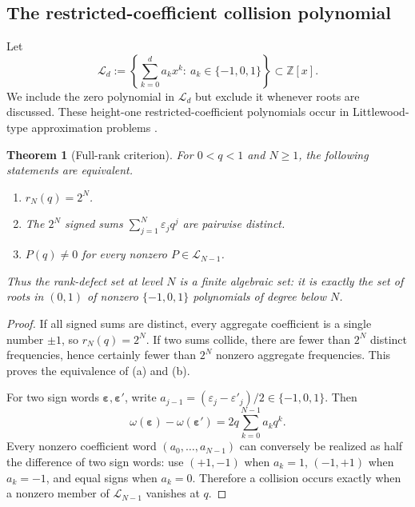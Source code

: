 \documentclass[11pt]{article}
\numberwithin{equation}{section}
\newtheorem{theorem}{Theorem}[section]
\theoremstyle{definition}
\theoremstyle{remark}
\newcommand{\Z}{\mathbb Z}
\newcommand{\eps}{\varepsilon}
\begin{document}
\subsection{The restricted-coefficient collision polynomial}

Let
\begin{equation}
 \mathscr L_d:=
 \left\{\sum_{k=0}^{d}a_kx^k:\ a_k\in\{-1,0,1\}\right\}
 \subset\Z[x].
 \label{eq:littlewood-class}
\end{equation}
We include the zero polynomial in $\mathscr L_d$ but exclude it whenever roots
are discussed.  These height-one restricted-coefficient polynomials occur in
Littlewood-type approximation problems \cite{BorweinPinner,BorweinErdelyiKos}.

\begin{theorem}[Full-rank criterion]
\label{thm:full-rank-criterion}
For $0<q<1$ and $N\ge1$, the following statements are equivalent.
\begin{enumerate}[label=(\alph*)]
 \item $r_N(q)=2^N$.
 \item The $2^N$ signed sums $\sum_{j=1}^{N}\eps_jq^j$ are pairwise distinct.
 \item $P(q)\ne0$ for every nonzero $P\in\mathscr L_{N-1}$.
\end{enumerate}
Thus the rank-defect set at level $N$ is a finite algebraic set: it is exactly
the set of roots in $(0,1)$ of nonzero $\{-1,0,1\}$ polynomials of degree below
$N$.
\end{theorem}
\begin{proof}
If all signed sums are distinct, every aggregate coefficient is a single number
$\pm1$, so $r_N(q)=2^N$.  If two sums collide, there are fewer than $2^N$
distinct frequencies, hence certainly fewer than $2^N$ nonzero aggregate
frequencies.  This proves the equivalence of (a) and (b).

For two sign words $\bm\eps,\bm\eps'$, write
$a_{j-1}=(\eps_j-\eps'_j)/2\in\{-1,0,1\}$.  Then
\begin{equation}
 \omega(\bm\eps)-\omega(\bm\eps')
 =2q\sum_{k=0}^{N-1}a_kq^k.
 \label{eq:collision-polynomial}
\end{equation}
Every nonzero coefficient word $(a_0,\ldots,a_{N-1})$ can conversely be
realized as half the difference of two sign words: use $(+1,-1)$ when
$a_k=1$, $(-1,+1)$ when $a_k=-1$, and equal signs when $a_k=0$.  Therefore a
collision occurs exactly when a nonzero member of $\mathscr L_{N-1}$ vanishes
at $q$.
\end{proof}
\end{document}
